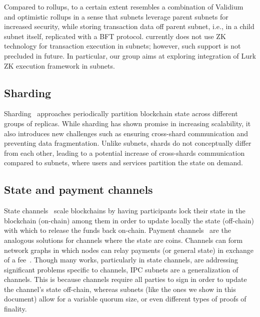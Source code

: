     Compared to rollups, \ipc to a certain extent resembles a combination of Validium and optimistic rollups in a sense that \ipc subnets leverage parent subnets for increased security, while storing transaction data off parent subnet, i.e., in a child subnet itself, replicated with a BFT protocol. \ipc currently does not use ZK technology for transaction execution in subnets; however, such support is not precluded in future. In particular, our group aims at exploring integration of Lurk ZK execution framework \cite{Lurkpaper} in \ipc subnets. 
    
    \subsection{Sharding} Sharding~\cite{zamani2018rapidchain, Leftheris2018Omniledger, Luu2016Shards, Yu2020Survey, avarikioti2021divide, androulaki2018Channels, wang2019monoxide, albassam2017chainspace, hong2021pyramid} approaches periodically partition blockchain state across different groups of replicas. While sharding has shown promise in increasing scalability, it also introduces new challenges such as ensuring cross-shard communication and preventing data fragmentation. Unlike subnets, shards do not conceptually differ from each other, leading to a potential increase of cross-shards communication compared to subnets, where users and services partition the state on demand.
    
    \subsection{State and payment channels} State channels~\cite{dziembowski2018general} scale blockchains by having participants lock their state in the blockchain (on-chain) among them in order to update locally the state (off-chain) with which to release the funds back on-chain. Payment channels~\cite{poon2016bitcoin, decker2015fast, burchert2018scalable} are the analogous solutions for channels where the state are coins. Channels can form network graphs in which nodes can relay payments (or general state) in exchange of a fee~\cite{lnd2018, BOLT, network2023raiden, clightning2023, eclair}. Though many works, particularly in state channels, are addressing significant problems specific to channels, IPC subnets are a generalization of channels. This is because channels require all parties to sign in order to update the channel's state off-chain, whereas subnets (like the ones we show in this document) allow for a variable quorum size, or even different types of proofs of finality.

